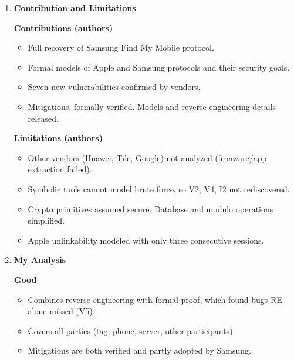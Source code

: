 \documentclass[11pt,a4paper]{article}
\newcommand{\entrypart}[1]{\textbf{\color{accent}#1}\par\vspace{2pt}}
\begin{document}
\begin{enumerate}
    \item \entrypart{Contribution and Limitations}

    \textbf{Contributions (authors)}
    \begin{itemize}
        \item Full recovery of Samsung Find My Mobile protocol.
        \item Formal models of Apple and Samsung protocols and their security goals.
        \item Seven new vulnerabilities confirmed by vendors.
        \item Mitigations, formally verified. Models and reverse engineering details released.
    \end{itemize}

    \vspace{4pt}
    \textbf{Limitations (authors)}
    \begin{itemize}
        \item Other vendors (Huawei, Tile, Google) not analyzed (firmware/app extraction failed).
        \item Symbolic tools cannot model brute force, so V2, V4, I2 not rediscovered.
        \item Crypto primitives assumed secure. Database and modulo operations simplified.
        \item Apple unlinkability modeled with only three consecutive sessions.
    \end{itemize}

    \item \entrypart{My Analysis}

    \textbf{Good}
    \begin{itemize}
        \item Combines reverse engineering with formal proof, which found bugs RE alone missed (V5).
        \item Covers all parties (tag, phone, server, other participants).
        \item Mitigations are both verified and partly adopted by Samsung.
    \end{itemize}


\end{enumerate}
\end{document}
